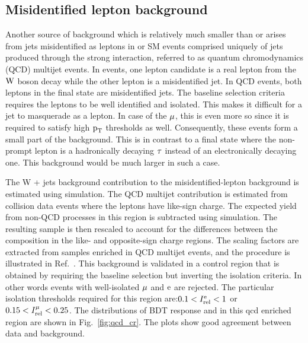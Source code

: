 \subsection{Misidentified lepton background}
\label{h125_misid_bg}
Another source of background which is relatively much smaller than \ttb or \ztt arises from jets misidentified as leptons in \wjets or SM events comprised uniquely of jets produced through the strong interaction, referred to as quantum chromodynamics (QCD) multijet events. In \wjets events, one lepton candidate is a real lepton from the $\text{W}$ boson decay while the other lepton is a misidentified jet. In QCD events, both leptons in the final state are misidentified jets. The baseline selection criteria requires the leptons to be well identified and isolated. This makes it difficult for a jet to masquerade as a lepton. In case of the $\mu$, this is even more so since it is required to satisfy high $\text{p}_\text{T}$ thresholds as well. Consequently, these events form a small part of the background. This is in contrast to a final state where the non-prompt lepton is a hadronically decaying $\tau$ instead of an electronically decaying one. This background would be much larger in such a case.

The W + jets background contribution to the misidentified-lepton background is estimated using simulation. The QCD multijet contribution is estimated from collision data events where the leptons have like-sign charge. The expected yield from non-QCD processes in this region is subtracted using simulation. The resulting sample is then rescaled to account for the differences between the composition in the like- and opposite-sign charge regions. The scaling factors are extracted from samples enriched in QCD multijet events, and the procedure is illustrated in Ref.~\cite{CMS-PAS-HIG-16-043}. This background is validated in a control region that is obtained by requiring the baseline selection but inverting the isolation criteria. In other words events with well-isolated $\mu$ and $\text{e}$ are rejected. The particular isolation thresholds required for this region are:$0.1 < I_\text{rel}^{\text{e}} < 1$ or $0.15 < I_\text{rel}^{\mu} < 0.25$. The distributions of BDT response and \mcol in this qcd enriched region are shown in Fig.~\ref{fig:qcd_cr}. The plots show good agreement between data and background.



